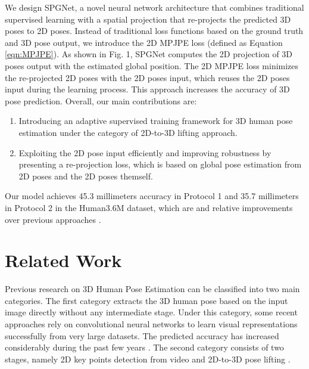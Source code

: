 \documentclass[runningheads]{llncs}
\begin{document}
We design SPGNet, a novel neural network architecture that combines traditional supervised learning with a spatial projection that re-projects the predicted 3D poses to 2D poses. Instead of traditional loss functions based on the ground truth and 3D pose output, we introduce the 2D MPJPE loss (defined as Equation \ref{eqn:MPJPE}). As shown in Fig. 1, SPGNet computes the 2D projection of 3D poses output with the estimated global position. The 2D MPJPE loss minimizes the re-projected 2D poses with the 2D poses input, which reuses the 2D poses input during the learning process. This approach increases the accuracy of 3D pose prediction. Overall, our main contributions are:
\begin{enumerate}
    \item Introducing an adaptive supervised training framework for 3D human pose estimation under the category of 2D-to-3D lifting approach. 
    \item  Exploiting the 2D pose input efficiently and improving robustness by presenting a re-projection loss, which is based on global pose estimation from 2D poses and the 2D poses themself.
\end{enumerate}
Our model achieves 45.3 millimeters accuracy in Protocol 1 and 35.7 millimeters in Protocol 2 in the Human3.6M dataset, which are  and  relative improvements over previous approaches \cite{Xu_2020_CVPR}.

\section{Related Work}

Previous research on 3D Human Pose Estimation can be classified into two main categories. The first category extracts the 3D human pose based on the input image directly without any intermediate stage. Under this category, some recent approaches rely on convolutional neural networks to learn visual representations successfully from very large datasets. The predicted accuracy has increased considerably during the past few years \cite{Sun_2018_ECCV,Pavlakos_2017_CVPR}. The second category consists of two stages, namely 2D key points detection from video and 2D-to-3D pose lifting \cite{Chen_2016_CVPR,Pavlakos_2018,MartinezHRL17}.
\end{document}
